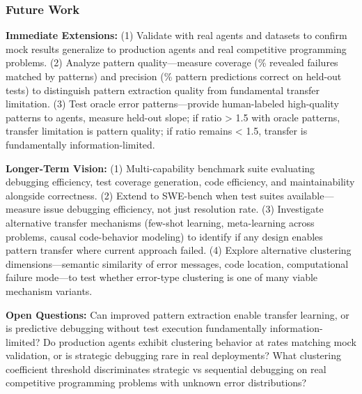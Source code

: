 \subsubsection{Future Work}

\textbf{Immediate Extensions:} (1) Validate with real agents and datasets to confirm mock results generalize to production agents and real competitive programming problems. (2) Analyze pattern quality---measure coverage (\% revealed failures matched by patterns) and precision (\% pattern predictions correct on held-out tests) to distinguish pattern extraction quality from fundamental transfer limitation. (3) Test oracle error patterns---provide human-labeled high-quality patterns to agents, measure held-out slope; if ratio > 1.5 with oracle patterns, transfer limitation is pattern quality; if ratio remains < 1.5, transfer is fundamentally information-limited.

\textbf{Longer-Term Vision:} (1) Multi-capability benchmark suite evaluating debugging efficiency, test coverage generation, code efficiency, and maintainability alongside correctness. (2) Extend to SWE-bench when test suites available---measure issue debugging efficiency, not just resolution rate. (3) Investigate alternative transfer mechanisms (few-shot learning, meta-learning across problems, causal code-behavior modeling) to identify if any design enables pattern transfer where current approach failed. (4) Explore alternative clustering dimensions---semantic similarity of error messages, code location, computational failure mode---to test whether error-type clustering is one of many viable mechanism variants.

\textbf{Open Questions:} Can improved pattern extraction enable transfer learning, or is predictive debugging without test execution fundamentally information-limited? Do production agents exhibit clustering behavior at rates matching mock validation, or is strategic debugging rare in real deployments? What clustering coefficient threshold discriminates strategic vs sequential debugging on real competitive programming problems with unknown error distributions?
